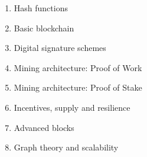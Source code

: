 \begin{enumerate}
  \item Hash functions
    
  \item Basic blockchain
    
  \item Digital signature schemes
  \item Mining architecture: Proof of Work
    
  \item Mining architecture: Proof of Stake
    
    
  \item Incentives, supply and resilience
  \item Advanced blocks 
  \item Graph theory and scalability
    
\end{enumerate}
